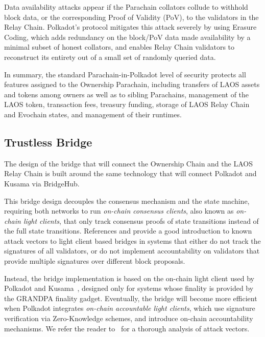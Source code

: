 Data availability attacks appear if the Parachain collators collude to 
withhold block data, or the corresponding Proof of Validity (PoV), to the 
validators in the Relay Chain. 
Polkadot's protocol mitigates this 
attack severely by using Erasure Coding\cite{al2018fraud}, which
adds redundancy on the block/PoV data 
made availability by a minimal subset of honest collators, and enables Relay Chain
validators to reconstruct its entirety out
of a small set of randomly queried data.

In summary, the standard Parachain-in-Polkadot level of security 
protects all features assigned to the Ownership Parachain,
including transfers of LAOS assets and tokens among owners as well as to
sibling Parachains, management of the LAOS token, 
transaction fees, treasury funding, storage of LAOS Relay Chain and Evochain states,
and management of their runtimes.

\subsection{Trustless Bridge}\label{sec:security-bridge}

The design of the bridge that will connect the Ownership Chain 
and the LAOS Relay Chain is built around the same technology that 
will connect Polkadot and Kusama via BridgeHub\cite{bridgehub}.

This bridge design decouples the consensus mechanism
and the state machine, requiring both networks to run 
{\it on-chain consensus clients}, also known as {\it on-chain light clients},
that only track consensus proofs of state
transitions instead of the full state transitions.
References \cite{SeunLanlege} and \cite{snowfork} provide a good introduction to 
known attack vectors to light client based bridges in systems
that either do not track the signatures of all validators, or do 
not implement accountability on validators that provide multiple signatures
over different block proposals. 

Instead, the bridge implementation is based on the on-chain light
client used by Polkadot and Kusama~\cite{parity-bridges}, 
designed only for systems whose finality is provided by the GRANDPA finality gadget.
Eventually, the bridge will become more efficient when Polkadot integrates
{\it on-chain accountable light clients}, which use signature
verification via Zero-Knowledge schemes, and introduce on-chain
accountability mechanisms. We refer the reader to~\cite{ciobotaru2022accountable}
for a thorough analysis of attack vectors.

